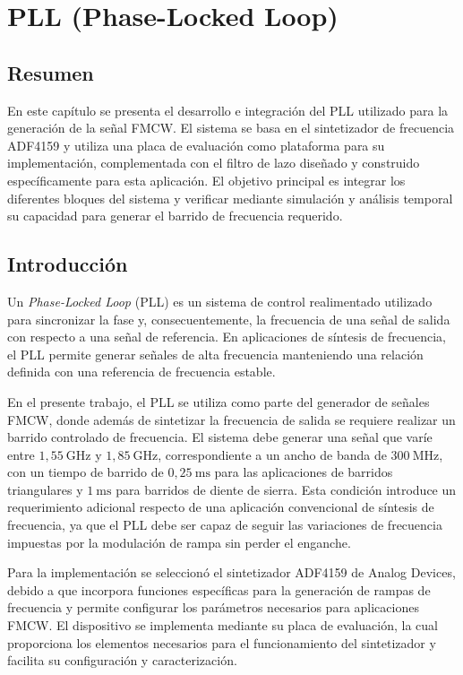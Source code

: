 \chapter{PLL (Phase-Locked Loop)}

\section*{Resumen}

En este capítulo se presenta el desarrollo e integración del PLL utilizado para la generación de la señal FMCW. El sistema se basa en el sintetizador de frecuencia ADF4159 y utiliza una placa de evaluación como plataforma para su implementación, complementada con el filtro de lazo diseñado y construido específicamente para esta aplicación. El objetivo principal es integrar los diferentes bloques del sistema y verificar mediante simulación y análisis temporal su capacidad para generar el barrido de frecuencia requerido.

\section{Introducción}

Un \textit{Phase-Locked Loop} (PLL) es un sistema de control realimentado utilizado para sincronizar la fase y, consecuentemente, la frecuencia de una señal de salida con respecto a una señal de referencia. En aplicaciones de síntesis de frecuencia, el PLL permite generar señales de alta frecuencia manteniendo una relación definida con una referencia de frecuencia estable.

En el presente trabajo, el PLL se utiliza como parte del generador de señales FMCW, donde además de sintetizar la frecuencia de salida se requiere realizar un barrido controlado de frecuencia. El sistema debe generar una señal que varíe entre $1{,}55~\mathrm{GHz}$ y $1{,}85~\mathrm{GHz}$, correspondiente a un ancho de banda de $300~\mathrm{MHz}$, con un tiempo de barrido de $0{,}25~\mathrm{ms}$ para las aplicaciones de barridos triangulares y $1~\mathrm{ms}$ para barridos de diente de sierra. Esta condición introduce un requerimiento adicional respecto de una aplicación convencional de síntesis de frecuencia, ya que el PLL debe ser capaz de seguir las variaciones de frecuencia impuestas por la modulación de rampa sin perder el enganche.

Para la implementación se seleccionó el sintetizador ADF4159 de Analog Devices, debido a que incorpora funciones específicas para la generación de rampas de frecuencia y permite configurar los parámetros necesarios para aplicaciones FMCW. El dispositivo se implementa mediante su placa de evaluación, la cual proporciona los elementos necesarios para el funcionamiento del sintetizador y facilita su configuración y caracterización.

